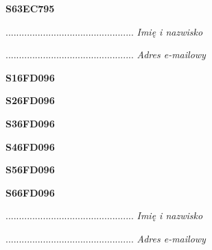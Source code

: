 \begin{turn}{90}\huge \textbf{S63EC795}\end{turn}

\begin{turn}{90}\begin{minipage}{\linewidth} \vspace{20mm} ................................................  \textit{Imię i nazwisko}\end{minipage}\end{turn}

\begin{turn}{90}\begin{minipage}{\linewidth} \vspace{20mm} ................................................  \textit{Adres e-mailowy}\end{minipage}\end{turn}

\begin{turn}{90}\huge \textbf{S16FD096}\end{turn}

\begin{turn}{90}\huge \textbf{S26FD096}\end{turn}

\begin{turn}{90}\huge \textbf{S36FD096}\end{turn}

\begin{turn}{90}\huge \textbf{S46FD096}\end{turn}

\begin{turn}{90}\huge \textbf{S56FD096}\end{turn}

\begin{turn}{90}\huge \textbf{S66FD096}\end{turn}

\begin{turn}{90}\begin{minipage}{\linewidth} \vspace{20mm} ................................................  \textit{Imię i nazwisko}\end{minipage}\end{turn}

\begin{turn}{90}\begin{minipage}{\linewidth} \vspace{20mm} ................................................  \textit{Adres e-mailowy}\end{minipage}\end{turn}

